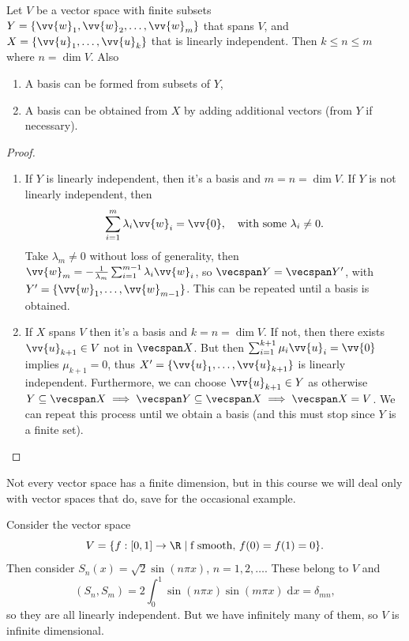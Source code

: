 \begin{proposition}
    Let $V$ be a vector space with finite subsets $Y = \{\vv{w}_1, \vv{w}_2, \dots, \vv{w}_m\}$ that spans $V$, and $X = \{\vv{u}_1, \dots, \vv{u}_k \}$ that is linearly independent. Then $k \leq n \leq m$ where $n = \operatorname{dim} V$. Also
    \begin{enumerate}[label=(\roman*)]
        \item A basis can be formed from subsets of $Y$,
        \item A basis can be obtained from $X$ by adding additional vectors (from $Y$ if necessary).
    \end{enumerate}
\end{proposition}
\begin{proof}
    \begin{enumerate}[label=(\roman*)]
        \item If $Y$ is linearly independent, then it's a basis and $m = n = \operatorname{dim} V$. If $Y$ is not linearly independent, then
        $$
        \sum_{i = 1}^m \lambda_i \vv{w}_i = \vv{0}, \quad \text{with some } \lambda_i \neq 0.
        $$
        Take $\lambda_m \neq 0$ without loss of generality, then $\vv{w}_m = -\frac{1}{\lambda_m} \sum_{i = 1}^{m - 1} \lambda_i \vv{w}_i$,
        so $\vecspan Y = \vecspan Y'$, with $Y' = \{\vv{w}_1, \dots, \vv{w}_{m - 1}\}$. This can be repeated until a basis is obtained.
        \item If $X$ spans $V$ then it's a basis and $k = n = \operatorname{dim} V$. If not, then there exists $\vv{u}_{k + 1} \in V$ not in $\vecspan X$. But then $\sum_{i = 1}^{k + 1} \mu_i \vv{u}_i = \vv{0}$ implies $\mu_{k + 1} = 0$, thus $X' = \{\vv{u}_1, \dots, \vv{u}_{k + 1} \}$ is linearly independent. Furthermore, we can choose $\vv{u}_{k + 1} \in Y$ as otherwise $Y \subseteq \vecspan X \implies \vecspan Y \subseteq \vecspan X \implies \vecspan X = V$.
        We can repeat this process until we obtain a basis (and this must stop since $Y$ is a finite set).   \qedhere
    \end{enumerate}
\end{proof}

Not every vector space has a finite dimension, but in this course we will deal only with vector spaces that do, save for the occasional example.

\begin{example}
    Consider the vector space
    $$
    V = \{ f : [0, 1] \rightarrow \R \mid \text{f smooth, } f(0) = f(1) = 0 \}. 
    $$
    Then consider $S_n(x) = \sqrt{2} \sin(n \pi x)$, $n = 1, 2, \dots$. These belong to $V$ and
    $$
    (S_n, S_m) = 2 \int_{0}^1 \sin (n \pi x) \sin (m \pi x) \; \mathrm{d}x = \delta_{mn},
    $$
    so they are all linearly independent. But we have infinitely many of them, so $V$ is infinite dimensional.
\end{example}

